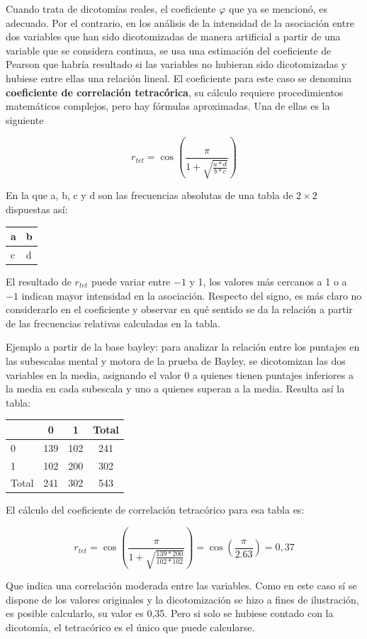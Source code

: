 \documentclass[]{book}
\begin{document}
Cuando trata de dicotomías reales, el coeficiente \(\varphi\) que ya se mencionó, es adecuado. Por el contrario, en los análisis de la intensidad de la asociación entre dos variables que han sido dicotomizadas de manera artificial a partir de una variable que se considera continua, se usa una estimación del coeficiente de Pearson que habría resultado si las variables no hubieran sido dicotomizadas y hubiese entre ellas una
relación lineal. El coeficiente para este caso se denomina \textbf{coeficiente de correlación tetracórica}, su cálculo requiere procedimientos matemáticos complejos, pero hay fórmulas aproximadas. Una de ellas es la siguiente

\[r_{tet} = \cos(\frac{\pi}{1 + \sqrt{\frac{a*d}{b*c}}})\]

En la que a, b, c y d son las frecuencias absolutas de una tabla de \(2 \times 2\)
dispuestas así:

\begin{longtable}[]{@{}ll@{}}
\toprule
a & b\tabularnewline
\midrule
\endhead
c & d\tabularnewline
\bottomrule
\end{longtable}

El resultado de \(r_{tet}\) puede variar entre \(-1\) y 1, los valores
más cercanos a 1 o a \(-1\) indican mayor intensidad en la asociación.
Respecto del signo, es más claro no considerarlo en el coeficiente y
observar en qué sentido se da la relación a partir de las frecuencias
relativas calculadas en la tabla.

Ejemplo a partir de la base bayley: para analizar la relación entre los puntajes en las subescalas mental y motora de la prueba de Bayley, se dicotomizan
las dos variables en la media, asignando el valor 0 a quienes tienen
puntajes inferiores a la media en cada subescala y uno a quienes superan a la media. Resulta así la tabla:

\begin{longtable}[]{@{}lccc@{}}
\toprule
& 0 & 1 & Total\tabularnewline
\midrule
\endhead
0 & 139 & 102 & 241\tabularnewline
1 & 102 & 200 & 302\tabularnewline
Total & 241 & 302 & 543\tabularnewline
\bottomrule
\end{longtable}

El cálculo del coeficiente de correlación tetracórico para esa tabla es:

\[r_{tet} = \cos(\frac{\pi}{1 + \sqrt{\frac{139*200}{102*102}}}) = \cos{(\frac{\pi}{2.63}) = 0,37}\]

Que indica una correlación moderada entre las variables. Como en este
caso sí se dispone de los valores originales y la dicotomización se hizo a fines de ilustración, es posible calcularlo, su valor es 0,35. Pero si solo se hubiese contado con la dicotomía, el tetracórico es el único que puede calcularse.
\end{document}
